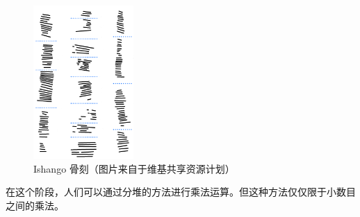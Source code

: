 \documentclass[a4paper,12pt]{article}
\begin{document}
\begin{figure}[ht]
\centering
\includegraphics[width=1.5in]{images/IshangoAllColumns.png}
\caption{Ishango 骨刻（图片来自于维基共享资源计划）}
\end{figure}

在这个阶段，人们可以通过分堆的方法进行乘法运算。但这种方法仅仅限于小数目之间的乘法。
\end{document}
